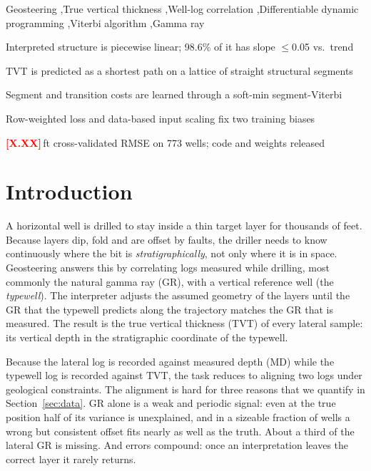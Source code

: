 \documentclass[preprint,12pt,authoryear]{elsarticle}
\newcommand{\PH}[1]{\textcolor{red}{\textbf{[#1]}}}
\begin{document}
\begin{frontmatter}
\begin{keyword}
Geosteering \sep True vertical thickness \sep Well-log correlation \sep Differentiable dynamic programming \sep Viterbi algorithm \sep Gamma ray
\end{keyword}

\begin{highlights}
\item Interpreted structure is piecewise linear; 98.6\% of it has slope $\le$0.05 vs.\ trend
\item TVT is predicted as a shortest path on a lattice of straight structural segments
\item Segment and transition costs are learned through a soft-min segment-Viterbi
\item Row-weighted loss and data-based input scaling fix two training biases
\item \PH{X.XX}\,ft cross-validated RMSE on 773 wells; code and weights released
\end{highlights}

\end{frontmatter}

\section{Introduction}\label{sec:intro}
A horizontal well is drilled to stay inside a thin target layer for thousands of feet. Because layers dip, fold and are offset by faults, the driller needs to know continuously where the bit is \emph{stratigraphically}, not only where it is in space. Geosteering answers this by correlating logs measured while drilling, most commonly the natural gamma ray (GR), with a vertical reference well (the \emph{typewell}). The interpreter adjusts the assumed geometry of the layers until the GR that the typewell predicts along the trajectory matches the GR that is measured. The result is the true vertical thickness (TVT) of every lateral sample: its vertical depth in the stratigraphic coordinate of the typewell.

Because the lateral log is recorded against measured depth (MD) while the typewell log is recorded against TVT, the task reduces to aligning two logs under geological constraints. The alignment is hard for three reasons that we quantify in Section~\ref{sec:data}. GR alone is a weak and periodic signal: even at the true position half of its variance is unexplained, and in a sizeable fraction of wells a wrong but consistent offset fits nearly as well as the truth. About a third of the lateral GR is missing. And errors compound: once an interpretation leaves the correct layer it rarely returns.
\end{document}
